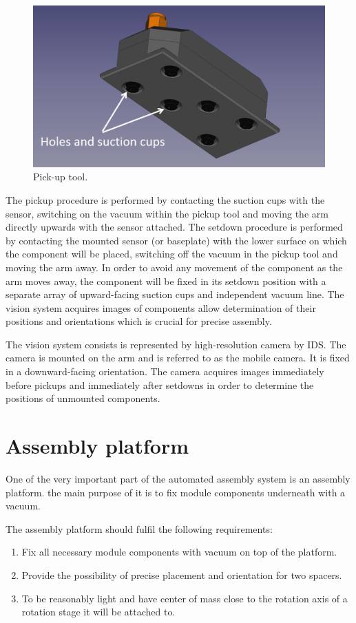 \begin{figure}[ht]\centering
\includegraphics[width=0.7\linewidth]{Data/Module_assembly/Pick_up_tool.png}
\caption{Pick-up tool.}
\label{fig:pick_up_tool}
\end{figure}

The pickup procedure is performed by contacting the suction cups with the sensor, switching on the vacuum within the pickup tool and moving the arm directly upwards with the sensor attached. The setdown procedure is performed by contacting the mounted sensor (or baseplate) with the lower surface on which the component will be placed, switching off the vacuum in the pickup tool and moving the arm away. In order to avoid any movement of the component as the arm moves away, the component will be fixed in its setdown position with a separate array of upward-facing suction cups and independent vacuum line. The vision system acquires images of components allow determination of their positions and orientations which is crucial for precise assembly.

The vision system consists is represented by high-resolution camera by IDS. The camera is mounted on the arm and is referred to as the mobile camera. It is fixed in a downward-facing orientation. The camera acquires images immediately before pickups and immediately after setdowns in order to determine the positions of unmounted components. 

\section{Assembly platform}

One of the very important part of the automated assembly system is an assembly platform. the main purpose of it is to fix module components underneath with a vacuum.

The assembly platform should fulfil the following requirements:

\begin{enumerate}
\setlength\itemsep{-0.5em}
\item Fix all necessary module components with vacuum on top of the platform.
\item Provide the possibility of precise placement and orientation for two spacers.
\item To be reasonably light and have center of mass close to the rotation axis of a rotation stage it will be attached to.
\end{enumerate}


